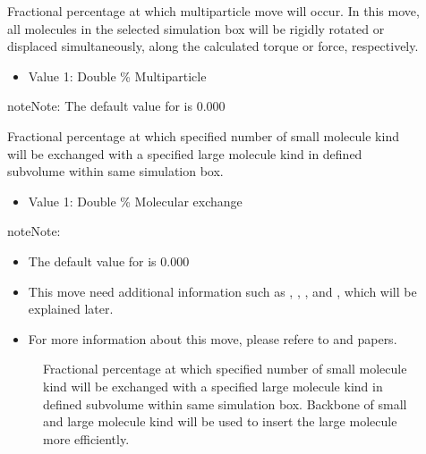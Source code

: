 \documentclass[letterpaper,10pt,english]{sphinxmanual}
\begin{document}
\begin{description}
\item[{}] \leavevmode
Fractional percentage at which multi\sphinxhyphen{}particle move will occur. In this move, all molecules in the selected simulation box will be rigidly rotated or displaced
simultaneously, along the calculated torque or force, respectively.
\begin{itemize}
\item {} 
Value 1: Double \sphinxhyphen{} \% Multiparticle

\end{itemize}

\begin{sphinxadmonition}{note}{Note:}
The default value for  is 0.000
\end{sphinxadmonition}

\item[{}] \leavevmode
Fractional percentage at which specified number of small molecule kind will be exchanged with a specified large molecule kind in defined sub\sphinxhyphen{}volume within same simulation box.
\begin{itemize}
\item {} 
Value 1: Double \sphinxhyphen{} \% Molecular exchange

\end{itemize}

\begin{sphinxadmonition}{note}{Note:}\begin{itemize}
\item {} 
The default value for  is 0.000

\item {} 
This move need additional information such as , , , and , which will be explained later.

\item {} 
For more information about this move, please refere to  and  papers.

\end{itemize}
\end{sphinxadmonition}
\begin{description}
\item[{}] \leavevmode
Fractional percentage at which specified number of small molecule kind will be exchanged with a specified large molecule kind in defined sub\sphinxhyphen{}volume within same simulation box. Backbone of small and large molecule kind will be used to insert the large molecule more efficiently.


\end{description}
\end{description}
\end{document}
